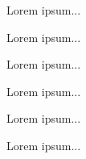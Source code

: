 \begin{exercise}[1/2023] Lorem ipsum... \end{exercise}
\begin{exercise}[2/2023] Lorem ipsum... \end{exercise}
\begin{exercise}[3/2023] Lorem ipsum... \end{exercise}
\begin{exercise}[4/2023] Lorem ipsum... \end{exercise}
\begin{exercise}[5/2023] Lorem ipsum... \end{exercise}
\begin{exercise}[6/2023] Lorem ipsum... \end{exercise}



